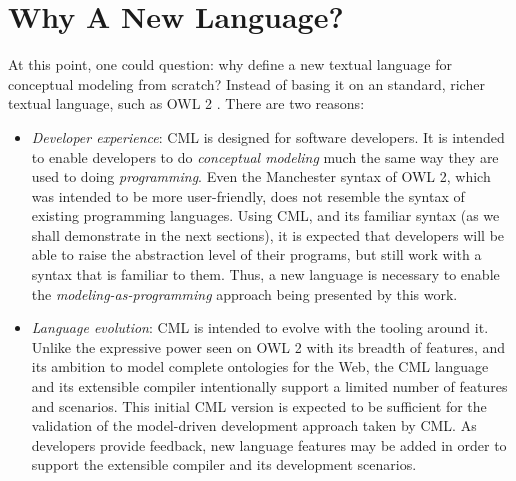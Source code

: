 \section{Why A New Language?}\label{sec:why}

At this point, one could question: why define a new textual language for conceptual modeling from scratch? Instead of basing it on an standard, richer textual language, such as OWL 2 \cite{owl2}. There are two reasons:
\begin{itemize}
\item\emph{Developer experience}: CML is designed for software developers.
It is intended to enable developers to do \emph{conceptual modeling} much the same way they are used to doing \emph{programming}.
Even the Manchester \cite{owl2manchester} syntax of OWL 2, which was intended to be more user-friendly, does not resemble the syntax of existing programming languages.
Using CML, and its familiar syntax (as we shall demonstrate in the next sections), it is expected that developers will be able to raise the abstraction level of their programs, but still work with a syntax that is familiar to them.
Thus, a new language is necessary to enable the \emph{modeling-as-programming} approach being presented by this work. 
\item\emph{Language evolution}: CML is intended to evolve with the tooling around it.
Unlike the expressive power seen on OWL 2 \cite{owl2} with its breadth of features,
and its ambition to model complete ontologies for the Web,
the CML language and its extensible compiler intentionally support a limited number of features and scenarios.
This initial CML version is expected to be sufficient for the validation of the model-driven development approach taken by CML.
As developers provide feedback, new language features may be added in order to support the extensible compiler and its development scenarios.
\end{itemize}
